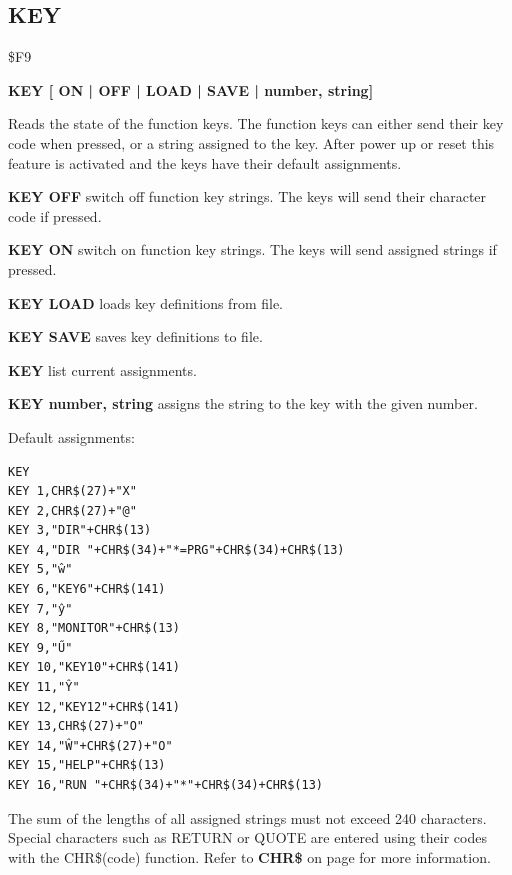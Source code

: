 \subsection{KEY}
\begin{description}[leftmargin=2cm,style=nextline]
\item [Token:] \$F9
\item [Format:] {\bf KEY [ ON | OFF | LOAD | SAVE | number, string]}
\item [Usage:] Reads the state of the function keys.
               The function keys can either send their key code
               when pressed, or a string assigned to the key.
               After power up or reset this feature is activated
               and the keys have their default assignments.

               {\bf KEY OFF} switch off function key strings.
               The keys will send their character code if pressed.

               {\bf KEY ON} switch on function key strings.
               The keys will send assigned strings if pressed.

               {\bf KEY LOAD} loads key definitions from file.

               {\bf KEY SAVE} saves key definitions to file.

               {\bf KEY} list current assignments.

               {\bf KEY number, string} assigns the string to
               the key with the given number.

               Default assignments:

\begin{tcolorbox}[colback=black,coltext=white]
\verbatimfont{\codefont}
\begin{verbatim}
KEY
KEY 1,CHR$(27)+"X"
KEY 2,CHR$(27)+"@"
KEY 3,"DIR"+CHR$(13)
KEY 4,"DIR "+CHR$(34)+"*=PRG"+CHR$(34)+CHR$(13)
KEY 5,"ŵ"
KEY 6,"KEY6"+CHR$(141)
KEY 7,"ŷ"
KEY 8,"MONITOR"+CHR$(13)
KEY 9,"Ű"
KEY 10,"KEY10"+CHR$(141)
KEY 11,"Ŷ"
KEY 12,"KEY12"+CHR$(141)
KEY 13,CHR$(27)+"O"
KEY 14,"Ŵ"+CHR$(27)+"O"
KEY 15,"HELP"+CHR$(13)
KEY 16,"RUN "+CHR$(34)+"*"+CHR$(34)+CHR$(13)
\end{verbatim}
\end{tcolorbox}

\item [Remarks:] The sum of the lengths of all assigned strings
                 must not exceed 240 characters.
                 Special characters such as RETURN or QUOTE are entered
                 using their codes with the CHR\$(code) function.
                 Refer to {\bf CHR\$} on page \pageref{chrcommand}
                 for more information.


\end{description}
